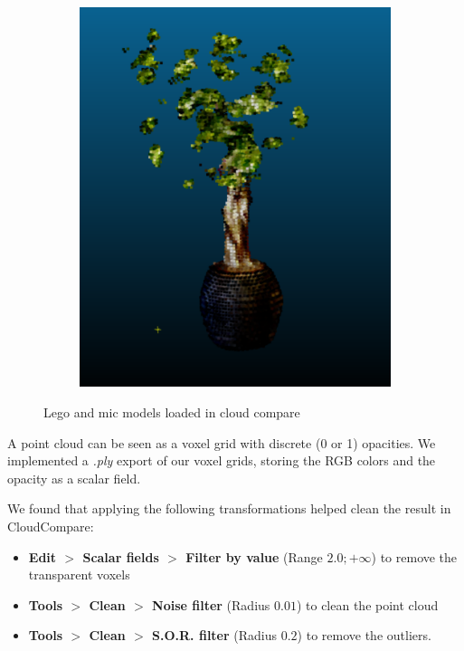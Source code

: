 \documentclass{article}
\begin{document}
\begin{figure}[!h]
\begin{subfigure}{.24\textwidth}
\end{subfigure}
\begin{subfigure}{.24\textwidth}
  \centering
  \includegraphics[width=\linewidth]{figs/pc/ficusc.png}  
\end{subfigure}
     \caption{Lego and mic models loaded in cloud compare}
    \label{fig:cc}
\end{figure}

A point cloud can be seen as a voxel grid with discrete (0 or 1) opacities. We implemented a \textit{.ply} export of our voxel grids, storing the RGB colors and the opacity as a scalar field. 

We found that applying the following transformations helped clean the result in CloudCompare:

\begin{itemize}
\item \textbf{Edit $>$ Scalar fields $>$ Filter by value} (Range $2.0; +\infty$) to remove the transparent voxels
\item \textbf{Tools $>$ Clean $>$ Noise filter} (Radius $0.01$) to clean the point cloud
\item \textbf{Tools $>$ Clean $>$ S.O.R. filter} (Radius $0.2$) to remove the outliers.
\end{itemize}
\end{document}
